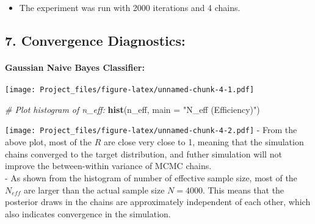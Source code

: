 \documentclass[
]{article}
\newenvironment{Shaded}{\begin{snugshade}}{\end{snugshade}}
\newcommand{\CommentTok}[1]{\textcolor[rgb]{0.56,0.35,0.01}{\textit{#1}}}
\newcommand{\DataTypeTok}[1]{\textcolor[rgb]{0.13,0.29,0.53}{#1}}
\newcommand{\DecValTok}[1]{\textcolor[rgb]{0.00,0.00,0.81}{#1}}
\newcommand{\KeywordTok}[1]{\textcolor[rgb]{0.13,0.29,0.53}{\textbf{#1}}}
\newcommand{\NormalTok}[1]{#1}
\newcommand{\OperatorTok}[1]{\textcolor[rgb]{0.81,0.36,0.00}{\textbf{#1}}}
\newcommand{\StringTok}[1]{\textcolor[rgb]{0.31,0.60,0.02}{#1}}
\providecommand{\tightlist}{%
  \setlength{\itemsep}{0pt}\setlength{\parskip}{0pt}}
\begin{document}
\begin{itemize}
\tightlist
\item
  The experiment was run with 2000 iterations and 4 chains.
\end{itemize}

\hypertarget{convergence-diagnostics}{%
\subsection{7. Convergence Diagnostics:}\label{convergence-diagnostics}}

\hypertarget{gaussian-naive-bayes-classifier-3}{%
\paragraph{Gaussian Naive Bayes
Classifier:}\label{gaussian-naive-bayes-classifier-3}}

\begin{Shaded}
\end{Shaded}

\texttt{[image: Project\_files/figure-latex/unnamed-chunk-4-1.pdf]}

\begin{Shaded}
\begin{Highlighting}[]
\CommentTok{\# Plot histogram of n\_eff:}
\KeywordTok{hist}\NormalTok{(n\_eff, }\DataTypeTok{main =} \StringTok{"N\_eff (Efficiency)"}\NormalTok{)}
\end{Highlighting}
\end{Shaded}

\texttt{[image: Project\_files/figure-latex/unnamed-chunk-4-2.pdf]} -
From the above plot, most of the \(\hat{R}\) are close very close to 1,
meaning that the simulation chains converged to the target distribution,
and futher simulation will not improve the between-within variance of
MCMC chains.\\
- As shown from the histogram of number of effective sample size, most
of the \(N_{eff}\) are larger than the actual sample size \(N = 4000\).
This means that the posterior draws in the chains are approximately
independent of each other, which also indicates convergence in the
simulation.
\end{document}
